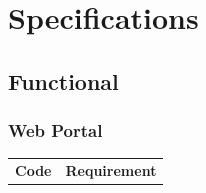 \documentclass[11pt,a4paper]{article}
\begin{document}
\section{Specifications}
\label{sec:specifications}

\subsection{Functional}
\label{sec:func-specs}

\subsubsection{Web Portal}

\begin{longtable}{|p{2.5cm}p{13cm}|}
\hline
\textbf{Code} & \textbf{Requirement} \\


\end{longtable}
\end{document}
